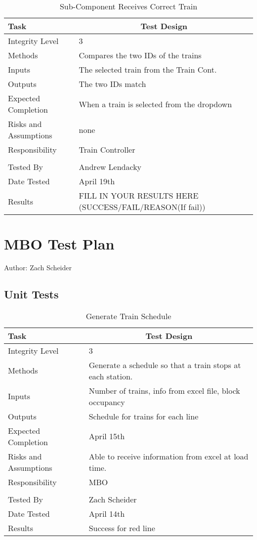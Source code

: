 \documentclass[]{article}
\begin{document}
\begin{table}[H]
	\centering
	\caption{Sub-Component Receives Correct Train}
	\begin{tabular}{|l|l|}
		\hline
		Task & \multicolumn{1}{c|}{Test Design} \\ \hline
		Integrity Level & 3 \\ \hline
		Methods & Compares the two IDs of the trains\\ \hline
		Inputs & The selected train from the Train Cont.\\ \hline
		Outputs & The two IDs match \\ \hline
		Expected Completion & When a train is selected from the dropdown\\ \hline
		Risks and Assumptions & none \\ \hline
		Responsibility & Train Controller\\ \hline
			\\ \hline
		Tested By   &  Andrew Lendacky\\	\hline
		Date Tested & \parbox[t]{10cm}{April 19th}\\ \hline
		Results & FILL IN YOUR RESULTS HERE (SUCCESS/FAIL/REASON(If fail))\\ \hline
	\end{tabular}
\end{table}

\section{MBO Test Plan}
Author: Zach Scheider

\subsection{Unit Tests}

\begin{table}[H]
	\centering
	\caption{Generate Train Schedule}
	\begin{tabular}{|l|l|}
		\hline
		Task & \multicolumn{1}{c|}{Test Design} \\ \hline
		Integrity Level & 3 \\ \hline
		Methods & Generate a schedule so that a train stops at each station. \\ \hline
		Inputs &  Number of trains, info from excel file, block occupancy \\ \hline
		Outputs &  Schedule for trains for each line \\ \hline
		Expected Completion & \parbox[t]{10cm}{April 15th}\\ \hline
		Risks and Assumptions & \parbox[t]{10cm}{Able to receive information from excel at load time.} \\ \hline
		Responsibility & MBO\\ \hline	
		\\ \hline
		Tested By   &  Zach Scheider\\	\hline
		Date Tested & \parbox[t]{10cm}{April 14th}\\ \hline
		Results & Success for red line\\ \hline
	\end{tabular}
\end{table}
\end{document}
